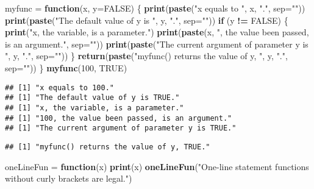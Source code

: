 \documentclass[
  12pt,
]{article}
\newenvironment{Shaded}{\begin{snugshade}}{\end{snugshade}}
\newcommand{\AttributeTok}[1]{\textcolor[rgb]{0.13,0.29,0.53}{#1}}
\newcommand{\ConstantTok}[1]{\textcolor[rgb]{0.56,0.35,0.01}{#1}}
\newcommand{\ControlFlowTok}[1]{\textcolor[rgb]{0.13,0.29,0.53}{\textbf{#1}}}
\newcommand{\DecValTok}[1]{\textcolor[rgb]{0.00,0.00,0.81}{#1}}
\newcommand{\FunctionTok}[1]{\textcolor[rgb]{0.13,0.29,0.53}{\textbf{#1}}}
\newcommand{\NormalTok}[1]{#1}
\newcommand{\OtherTok}[1]{\textcolor[rgb]{0.56,0.35,0.01}{#1}}
\newcommand{\SpecialCharTok}[1]{\textcolor[rgb]{0.81,0.36,0.00}{\textbf{#1}}}
\newcommand{\StringTok}[1]{\textcolor[rgb]{0.31,0.60,0.02}{#1}}
\begin{document}
\begin{Shaded}
\begin{Highlighting}[]
\NormalTok{myfunc }\OtherTok{=} \ControlFlowTok{function}\NormalTok{(x, }\AttributeTok{y=}\ConstantTok{FALSE}\NormalTok{) \{}
  \FunctionTok{print}\NormalTok{(}\FunctionTok{paste}\NormalTok{(}\StringTok{"x equals to "}\NormalTok{, x, }\StringTok{"."}\NormalTok{, }\AttributeTok{sep=}\StringTok{""}\NormalTok{))}
  \FunctionTok{print}\NormalTok{(}\FunctionTok{paste}\NormalTok{(}\StringTok{"The default value of y is "}\NormalTok{, y, }\StringTok{"."}\NormalTok{, }\AttributeTok{sep=}\StringTok{""}\NormalTok{))}
  \ControlFlowTok{if}\NormalTok{ (y }\SpecialCharTok{!=} \ConstantTok{FALSE}\NormalTok{) \{}
    \FunctionTok{print}\NormalTok{(}\StringTok{"x, the variable, is a parameter."}\NormalTok{)}
    \FunctionTok{print}\NormalTok{(}\FunctionTok{paste}\NormalTok{(x, }\StringTok{", the value been passed, is an argument."}\NormalTok{, }\AttributeTok{sep=}\StringTok{""}\NormalTok{))}
    \FunctionTok{print}\NormalTok{(}\FunctionTok{paste}\NormalTok{(}\StringTok{"The current argument of parameter y is "}\NormalTok{, y, }\StringTok{"."}\NormalTok{, }\AttributeTok{sep=}\StringTok{""}\NormalTok{))}
\NormalTok{  \}}
  \FunctionTok{return}\NormalTok{(}\FunctionTok{paste}\NormalTok{(}\StringTok{"myfunc() returns the value of y, "}\NormalTok{, y, }\StringTok{"."}\NormalTok{, }\AttributeTok{sep=}\StringTok{""}\NormalTok{))}
\NormalTok{\}}
\FunctionTok{myfunc}\NormalTok{(}\DecValTok{100}\NormalTok{, }\ConstantTok{TRUE}\NormalTok{)}
\end{Highlighting}
\end{Shaded}

\begin{verbatim}
## [1] "x equals to 100."
## [1] "The default value of y is TRUE."
## [1] "x, the variable, is a parameter."
## [1] "100, the value been passed, is an argument."
## [1] "The current argument of parameter y is TRUE."
\end{verbatim}

\begin{verbatim}
## [1] "myfunc() returns the value of y, TRUE."
\end{verbatim}

\begin{Shaded}
\begin{Highlighting}[]
\NormalTok{oneLineFun }\OtherTok{=} \ControlFlowTok{function}\NormalTok{(x)}
  \FunctionTok{print}\NormalTok{(x)}
\FunctionTok{oneLineFun}\NormalTok{(}\StringTok{"One{-}line statement functions without curly brackets are legal."}\NormalTok{)}
\end{Highlighting}
\end{Shaded}
\end{document}
